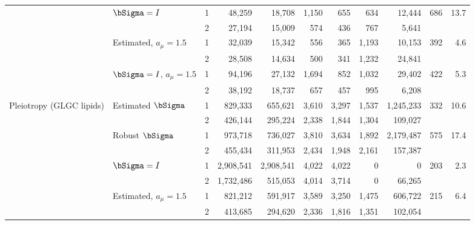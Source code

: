 {\begin{longtable}{ll c rrrr rrr r}
 & $\bSigma=I$ & 1 & 48{,}259 & 18{,}708 & 1{,}150 & 655 & 634 & 12{,}444 & 686 & 13.7\\
 &  & 2 & 27{,}194 & 15{,}009 & 574 & 436 & 767 & 5{,}641 &  & \\
 & Estimated, $a_\mu=1.5$ & 1 & 32{,}039 & 15{,}342 & 556 & 365 & 1{,}193 & 10{,}153 & 392 & 4.6\\
 &  & 2 & 28{,}508 & 14{,}634 & 500 & 341 & 1{,}232 & 24{,}841 &  & \\
 & $\bSigma=I$, $a_\mu=1.5$ & 1 & 94{,}196 & 27{,}132 & 1{,}694 & 852 & 1{,}032 & 29{,}402 & 422 & 5.3\\
 &  & 2 & 38{,}192 & 18{,}737 & 657 & 457 & 995 & 6{,}208 &  & \\
\midrule
Pleiotropy (GLGC lipids) & Estimated $\bSigma$ & 1 & 829{,}333 & 655{,}621 & 3{,}610 & 3{,}297 & 1{,}537 & 1{,}245{,}233 & 332 & 10.6\\
 &  & 2 & 426{,}144 & 295{,}224 & 2{,}338 & 1{,}844 & 1{,}304 & 109{,}027 &  & \\
 & Robust $\bSigma$ & 1 & 973{,}718 & 736{,}027 & 3{,}810 & 3{,}634 & 1{,}892 & 2{,}179{,}487 & 575 & 17.4\\
 &  & 2 & 455{,}434 & 311{,}953 & 2{,}434 & 1{,}948 & 2{,}161 & 157{,}387 &  & \\
 & $\bSigma=I$ & 1 & 2{,}908{,}541 & 2{,}908{,}541 & 4{,}022 & 4{,}022 & 0 & 0 & 203 & 2.3\\
 &  & 2 & 1{,}732{,}486 & 515{,}053 & 4{,}014 & 3{,}714 & 0 & 66{,}265 &  & \\
 & Estimated, $a_\mu=1.5$ & 1 & 821{,}212 & 591{,}917 & 3{,}589 & 3{,}250 & 1{,}475 & 606{,}722 & 215 & 6.4\\
 &  & 2 & 413{,}685 & 294{,}620 & 2{,}336 & 1{,}816 & 1{,}351 & 102{,}054 &  & \\
\end{longtable}}
